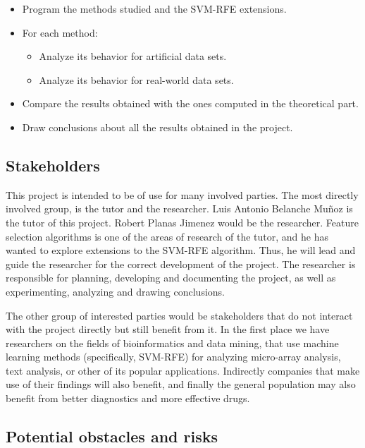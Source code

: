 \begin{itemize}
    \item Program the methods studied and the SVM-RFE extensions.
    \item {
        For each method:
        \begin{itemize}
            \item Analyze its behavior for artificial data sets.
            \item Analyze its behavior for real-world data sets.
        \end{itemize}
    }
    \item Compare the results obtained with the ones computed in the theoretical part.
    \item Draw conclusions about all the results obtained in the project.
\end{itemize}


\subsection{Stakeholders}

This project is intended to be of use for many involved parties. The most directly involved group, is the tutor and the researcher. Luis Antonio Belanche Muñoz is the tutor of this project. Robert Planas Jimenez would be the researcher. Feature selection algorithms is one of the areas of research of the tutor, and he has wanted to explore extensions to the SVM-RFE algorithm. Thus, he will lead and guide the researcher for the correct development of the project. The researcher is responsible for planning, developing and documenting the project, as well as experimenting, analyzing and drawing conclusions.

The other group of interested parties would be stakeholders that do not interact with the project directly but still benefit from it. In the first place we have researchers on the fields of bioinformatics and data mining, that use machine learning methods (specifically, SVM-RFE) for analyzing micro-array analysis, text analysis, or other of its popular applications. Indirectly companies that make use of their findings will also benefit, and finally the general population may also benefit from better diagnostics and more effective drugs. 

\label{sec:risk}
\subsection{Potential obstacles and risks}

